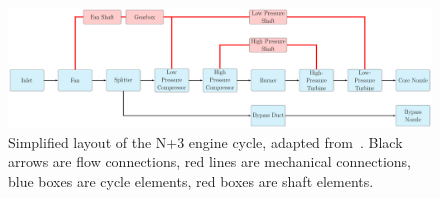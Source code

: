 \documentclass[conf]{new-aiaa}
\begin{document}
\begin{figure}[hbt!]
    \centering
    \includegraphics[width=1.0\textwidth]{N3_cycle.pdf}
    \caption{
        Simplified layout of the N+3 engine cycle, adapted from~\citet{Hendricks2019}.
        Black arrows are flow connections, red lines are mechanical connections, blue boxes are cycle elements, red boxes are shaft elements.
    }
    \label{fig:N3_original}
\end{figure}


\end{document}
